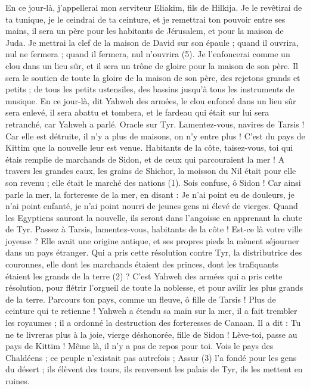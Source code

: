 \begin{multicols}{2}
{En ce jour-là, j'appellerai mon serviteur Eliakim, fils de Hilkija.
Je le revêtirai de ta tunique, je le ceindrai de ta ceinture, et je remettrai ton pouvoir entre ses mains, il sera un père pour les habitants de Jérusalem, et pour la maison de Juda.
Je mettrai la clef de la maison de David sur son épaule ; quand il ouvrira, nul ne fermera ; quand il fermera, nul n’ouvrira (5).
Je l’enfoncerai comme un clou dans un lieu sûr, et il sera un trône de gloire pour la maison de son père.
Il sera le soutien de toute la gloire de la maison de son père, des rejetons grands et petits ; de tous les petits ustensiles, des bassins jusqu’à tous les instruments de musique.
En ce jour-là, dit Yahweh des armées, le clou enfoncé dans un lieu sûr sera enlevé, il sera abattu et tombera, et le fardeau qui était sur lui sera retranché, car Yahweh a parlé.
\VerseOne{}Oracle sur Tyr. Lamentez-vous, navires de Tarsis ! Car elle est détruite, il n'y a plus de maisons, on n'y entre plus ! C’est du pays de Kittim que la nouvelle leur est venue.
Habitants de la côte, taisez-vous, toi qui étais remplie de marchands de Sidon, et de ceux qui parcouraient la mer !
A travers les grandes eaux, les grains de Shichor, la moisson du Nil était pour elle son revenu ; elle était le marché des nations (1).
Sois confuse, ô Sidon ! Car ainsi parle la mer, la forteresse de la mer, en disant : Je n'ai point eu de douleurs, je n'ai point enfanté, je n'ai point nourri de jeunes gens ni élevé de vierges.
Quand les Egyptiens sauront la nouvelle, ils seront dans l’angoisse en apprenant la chute de Tyr.
Passez à Tarsis, lamentez-vous, habitants de la côte !
Est-ce là votre ville joyeuse ? Elle avait une origine antique, et ses propres pieds la mènent séjourner dans un pays étranger.
Qui a pris cette résolution contre Tyr, la distributrice des couronnes, elle dont les marchands étaient des princes, dont les trafiquants étaient les grands de la terre (2) ?
C’est Yahweh des armées qui a pris cette résolution, pour flétrir l'orgueil de toute la noblesse, et pour avilir les plus grands de la terre.
Parcours ton pays, comme un fleuve, ô fille de Tarsis ! Plus de ceinture qui te retienne !
Yahweh a étendu sa main sur la mer, il a fait trembler les royaumes ; il a ordonné la destruction des forteresses de Canaan.
Il a dit : Tu ne te livreras plus à la joie, vierge déshonorée, fille de Sidon ! Lève-toi, passe au pays de Kittim ! Même là, il n’y a pas de repos pour toi.
Vois le pays des Chaldéens ; ce peuple n’existait pas autrefois ; Assur (3) l'a fondé pour les gens du désert ; ils élèvent des tours, ils renversent les palais de Tyr, ils les mettent en ruines.
}
\end{multicols}
